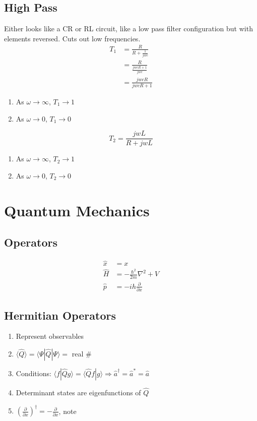 \documentclass[10pt,a4paper]{article}
\begin{document}
\subsection{High Pass}
Either looks like a CR or RL circuit, like a low pass filter configuration but with elements reversed. Cuts out low frequencies.
\begin{align}
 T_1 &= \frac{R}{R + \frac{1}{jwc}}\\
 &= \frac{R}{\frac{jwcR + 1}{jwc}}\\
 &= \frac{jwcR}{jwcR + 1}
\end{align}
\begin{enumerate}
    \item As $\omega \rightarrow \infty$, $T_1 \rightarrow 1$
    \item As $\omega \rightarrow 0$, $T_1 \rightarrow 0$
\end{enumerate}
\begin{equation}
 T_2 = \frac{jwL}{R+jwL}
\end{equation}
\begin{enumerate}
    \item As $\omega \rightarrow \infty$, $T_2 \rightarrow 1$
    \item As $\omega \rightarrow 0$, $T_2 \rightarrow 0$
\end{enumerate}


\section{Quantum Mechanics}
\subsection{Operators}

\begin{align}
 \hat{x} &= x\\
 \hat{H} &= - \frac{\hbar^2}{2m}\nabla^2 + V\\
 \hat{p} &= -ih \frac{\partial}{\partial x}
\end{align}

\subsection{Hermitian Operators}
\begin{enumerate}
    \item Represent observables
    \item $\langle \hat{Q} \rangle = \langle \Psi | \hat{Q} | \Psi \rangle = $ real \#
    \item Conditions: $\langle f | \hat{Q} g \rangle = \langle \hat{Q}f|g \rangle \Rightarrow \hat{a}^\dagger = \hat{a}^* = \hat{a}$
    \item Determinant states are eigenfunctions of $\hat{Q}$
    \item $\left( \frac{\partial}{\partial x} \right)^\dagger = - \frac{\partial}{\partial x} $, note
\end{enumerate}
\end{document}
